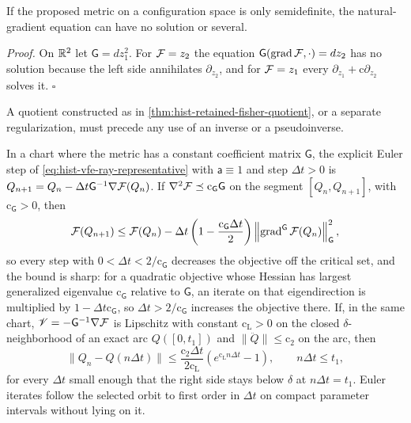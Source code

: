 If the proposed metric on a configuration space is only semidefinite, the
natural-gradient equation can have no solution or several.  

\noindent\emph{Proof.}
On $\mathbb R^2$ let $\mathsf G=dz_1^2$.  For $\mathcal F=z_2$ the equation
$\mathsf G(\operatorname{grad}\mathcal F,\cdot)=dz_2$ has no solution because the left side
annihilates $\partial_{z_2}$, and for $\mathcal F=z_1$ every
$\partial_{z_1}+\mathrm c\partial_{z_2}$ solves it.  $\square$

A quotient constructed as in \cref{thm:hist-retained-fisher-quotient}, or a separate
regularization, must precede any use of an inverse or a pseudoinverse.

In a chart where the metric has a constant coefficient matrix $\mathsf G$, the explicit
Euler step of \eqref{eq:hist-vfe-ray-representative} with $\mathsf a\equiv1$ and step
$\Delta t>0$ is $Q_{n+1}=Q_n-\Delta t\mathsf G^{-1}\nabla\mathcal F(Q_n)$.  If
$\nabla^2\mathcal F\preceq\mathrm c_{\mathsf G}\mathsf G$ on the segment $[Q_n,Q_{n+1}]$,
with $\mathrm c_{\mathsf G}>0$, then
\begin{equation}
\mathcal F(Q_{n+1})
\leq\mathcal F(Q_n)
-\Delta t\left(1-\frac{\mathrm c_{\mathsf G}\Delta t}{2}\right)
\left\|\operatorname{grad}^{\mathsf G}\mathcal F(Q_n)\right\|^2_{\mathsf G},
\label{eq:hist-discrete-descent-bound}
\end{equation}
so every step with $0<\Delta t<2/\mathrm c_{\mathsf G}$ decreases the objective off the
critical set, and the bound is sharp: for a quadratic objective whose Hessian has largest
generalized eigenvalue $\mathrm c_{\mathsf G}$ relative to $\mathsf G$, an iterate on that
eigendirection is multiplied by $1-\Delta t\mathrm c_{\mathsf G}$, so
$\Delta t>2/\mathrm c_{\mathsf G}$ increases the objective there.  If, in the same chart,
$\mathscr V=-\mathsf G^{-1}\nabla\mathcal F$ is Lipschitz with constant
$\mathrm c_{\mathrm L}>0$ on the closed $\delta$-neighborhood of an exact arc $Q([0,t_1])$
and $\lVert\ddot Q\rVert\leq\mathrm c_2$ on the arc, then
\begin{equation}
\lVert Q_n-Q(n\Delta t)\rVert
\leq\frac{\mathrm c_2\Delta t}{2\mathrm c_{\mathrm L}}\left(e^{\mathrm c_{\mathrm L}n\Delta t}-1\right),
\qquad n\Delta t\leq t_1,
\label{eq:hist-euler-global-error}
\end{equation}
for every $\Delta t$ small enough that the right side stays below $\delta$ at
$n\Delta t=t_1$.  Euler iterates follow the selected orbit to first order in $\Delta t$
on compact parameter intervals without lying on it.  

